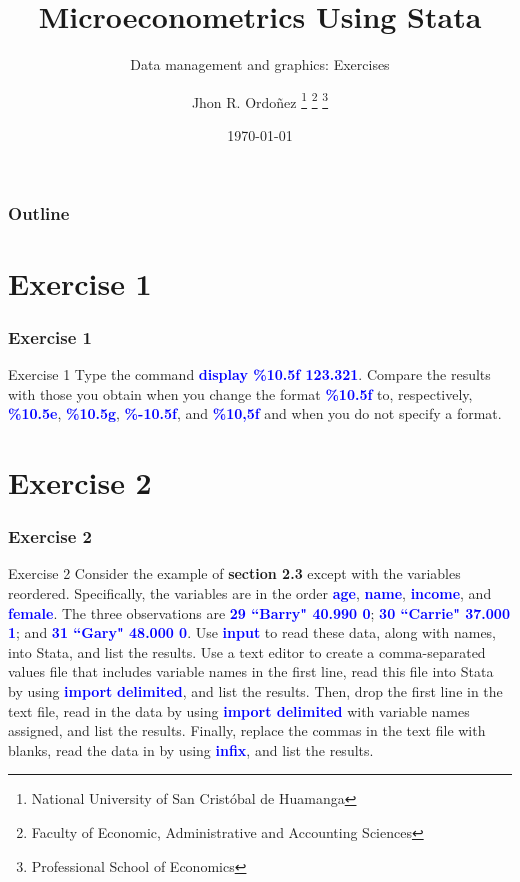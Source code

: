 \documentclass[11pt, aspectratio=169]{beamer}
\title{Microeconometrics Using Stata}
\subtitle{Data management and graphics: Exercises}
\author{
		Jhon R. Ordoñez
		\footnote{\label{1} National University of San Cristóbal de Huamanga}
		\footnote{\label{2} Faculty of Economic, Administrative and Accounting Sciences}
		\footnote{\label{3} Professional School of Economics}
	}
\date{\today}
\begin{document}
	\begin{frame}
		\maketitle
	\end{frame}
	\begin{frame}[t]
		\frametitle{Outline}
		\tableofcontents
	\end{frame}
	\section{Exercise 1}
		\begin{frame}
			\frametitle{Exercise 1}
				\begin{block}{Exercise 1}
					Type the command \textcolor{blue}{\textbf{display \%10.5f 123.321}}. Compare the results with
					those you obtain when you change the format \textcolor{blue}{\textbf{\%10.5f}} to, respectively,
					\textcolor{blue}{\textbf{\%10.5e}}, \textcolor{blue}{\textbf{\%10.5g}}, \textcolor{blue}{\textbf{\%-10.5f}}, 
					and \textcolor{blue}{\textbf{\%10,5f}} and when you do not specify a format.
				\end{block}
		\end{frame}
	\section{Exercise 2}
		\begin{frame}
			\frametitle{Exercise 2}
			\begin{block}{Exercise 2}
				Consider the example of \textcolor{red!50}{\textbf{section 2.3}} except with the variables
				reordered. Specifically, the variables are in the order \textcolor{blue}{\textbf{age}}, \textcolor{blue}{\textbf{name}},
				\textcolor{blue}{\textbf{income}}, and \textcolor{blue}{\textbf{female}}.
				The three observations are \textcolor{blue}{\textbf{29  “Barry" 40.990 0}}; \textcolor{blue}{\textbf{30  “Carrie" 37.000 1}}; and
				\textcolor{blue}{\textbf{31  “Gary" 48.000 0}}. Use \textcolor{blue}{\textbf{input}} to
				read these data, along with names, into Stata, and list the results. Use a
				text editor to create a comma-separated values file that includes
				variable names in the first line, read this file into Stata by using \textcolor{blue}{\textbf{import}}
				\textcolor{blue}{\textbf{delimited}}, and list the results. Then, drop the first line in the text file,
				read in the data by using \textcolor{blue}{\textbf{import delimited}} with variable names
				assigned, and list the results. Finally, replace the commas in the text
				file with blanks, read the data in by using \textcolor{blue}{\textbf{infix}}, and list the results.
			\end{block}
		\end{frame}
\end{document}
